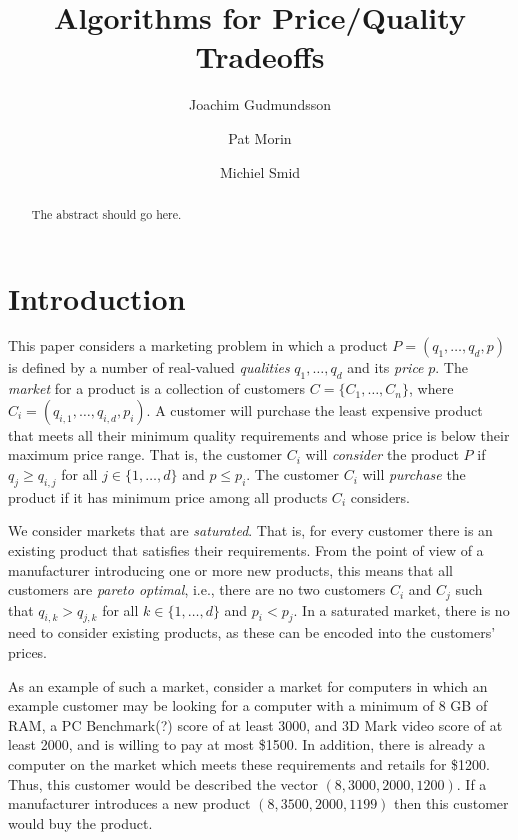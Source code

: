 \documentclass[lotsofwhite]{patmorin}
\title{Algorithms for Price/Quality Tradeoffs}
\author{Joachim Gudmundsson%
	\and Pat Morin%
	\and Michiel Smid}
\begin{document}
\maketitle

\begin{abstract}
The abstract should go here.
\end{abstract}

\section{Introduction}

This paper considers a marketing problem in which a product
$P=(q_1,\ldots,q_d,p)$ is defined by a number of real-valued
\emph{qualities} $q_1,\ldots,q_d$ and its \emph{price} $p$.  The
\emph{market} for a product is a collection of customers
$C=\{C_1,\ldots,C_n\}$, where $C_i=(q_{i,1},\ldots,q_{i,d},p_i)$.  A
customer will purchase the least expensive product that meets all
their minimum quality requirements and whose price is below their
maximum price range.  That is, the customer $C_i$ will \emph{consider}
the product $P$ if $q_j \ge q_{i,j}$ for all $j\in\{1,\ldots,d\}$ and
$p \le p_i$.  The customer $C_i$ will \emph{purchase} the product if
it has minimum price among all products $C_i$ considers.

We consider markets that are \emph{saturated}.  That is, for every
customer there is an existing product that satisfies their
requirements. From the point of view of a manufacturer introducing one
or more new products, this means that all customers are \emph{pareto
optimal}, i.e., there are no two customers $C_i$ and $C_j$ such that
$q_{i,k} > q_{j,k}$ for all $k\in\{1,\ldots,d\}$ and $p_i < p_j$.  In
a saturated market, there is no need to consider existing products, as
these can be encoded into the customers' prices.

As an example of such a market, consider a market for computers in
which an example customer may be looking for a computer with a minimum
of 8 GB of RAM, a PC Benchmark(?) score of at least 3000, and 3D
Mark video score of at least 2000, and is willing to pay at most
\$1500.  In addition, there is already a computer on the market which
meets these requirements and retails for \$1200.  Thus, this customer
would be described the vector $(8,3000,2000,1200)$.  If a manufacturer
introduces a new product $(8,3500,2000,1199)$ then this customer would
buy the product.
\end{document}
